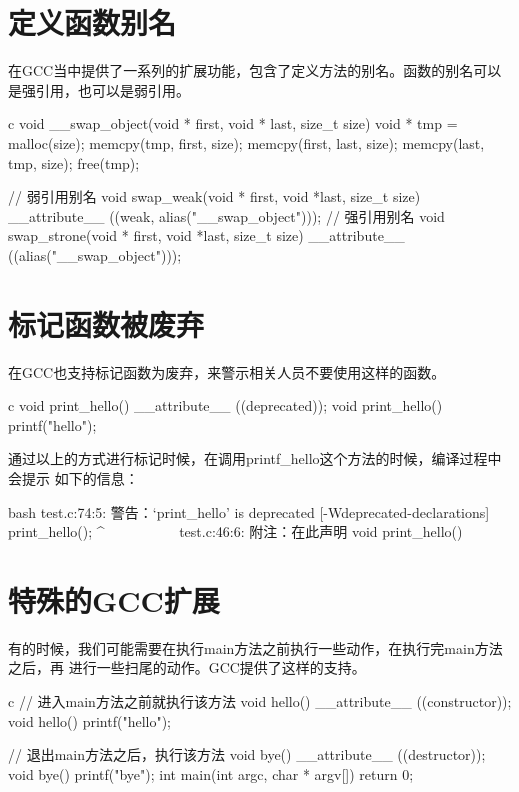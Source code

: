 \section{定义函数别名}
在GCC当中提供了一系列的扩展功能，包含了定义方法的别名。函数的别名可以是强引用，也可以是弱引用。
\begin{code-block}{c}
void __swap_object(void * first, void * last, size_t size)
{
    void * tmp = malloc(size);
    memcpy(tmp, first, size);
    memcpy(first, last, size);
    memcpy(last, tmp, size);
    free(tmp);
}

// 弱引用别名
void swap_weak(void * first, void *last, size_t size)
        __attribute__ ((weak, alias("__swap_object")));
// 强引用别名
void swap_strone(void * first, void *last, size_t size)
        __attribute__ ((alias("__swap_object")));
\end{code-block}

\section{标记函数被废弃}
在GCC也支持标记函数为废弃，来警示相关人员不要使用这样的函数。
\begin{code-block}{c}
void print_hello() __attribute__ ((deprecated));
void print_hello()
{
    printf("hello\n");
}
\end{code-block}

通过以上的方式进行标记时候，在调用printf\_hello这个方法的时候，编译过程中会提示
如下的信息：
\begin{code-block}{bash}
test.c:74:5: 警告：‘print_hello’ is deprecated [-Wdeprecated-declarations]
     print_hello();
     ^~~~~~~~~~~
test.c:46:6: 附注：在此声明
 void print_hello()
\end{code-block}

\section{特殊的GCC扩展}
有的时候，我们可能需要在执行main方法之前执行一些动作，在执行完main方法之后，再
进行一些扫尾的动作。GCC提供了这样的支持。
\begin{code-block}{c}
// 进入main方法之前就执行该方法
void hello() __attribute__ ((constructor));
void hello()
{
    printf("hello\n");
}

// 退出main方法之后，执行该方法
void bye() __attribute__ ((destructor));
void bye()
{
    printf("bye\n");
}
int main(int argc, char * argv[])
{
    return 0;
}
\end{code-block}

